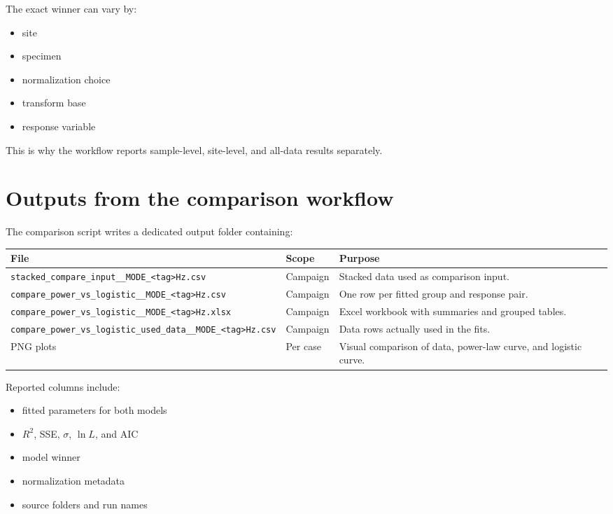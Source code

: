 \documentclass[11pt]{article}
\begin{document}
The exact winner can vary by:
\begin{itemize}[leftmargin=1.5em]
\item site
\item specimen
\item normalization choice
\item transform base
\item response variable
\end{itemize}

This is why the workflow reports sample-level, site-level, and all-data results separately.

\section{Outputs from the comparison workflow}

The comparison script writes a dedicated output folder containing:
\begin{longtable}{p{} p{} p{}}
\toprule
\textbf{File} & \textbf{Scope} & \textbf{Purpose}\\
\midrule
\endhead
\texttt{stacked\_compare\_input\_\_MODE\_<tag>Hz.csv} & Campaign & Stacked data used as comparison input.\\
\texttt{compare\_power\_vs\_logistic\_\_MODE\_<tag>Hz.csv} & Campaign & One row per fitted group and response pair.\\
\texttt{compare\_power\_vs\_logistic\_\_MODE\_<tag>Hz.xlsx} & Campaign & Excel workbook with summaries and grouped tables.\\
\texttt{compare\_power\_vs\_logistic\_used\_data\_\_MODE\_<tag>Hz.csv} & Campaign & Data rows actually used in the fits.\\
PNG plots & Per case & Visual comparison of data, power-law curve, and logistic curve.\\
\bottomrule
\end{longtable}

Reported columns include:
\begin{itemize}[leftmargin=1.5em]
\item fitted parameters for both models
\item $R^2$, SSE, $\sigma$, $\ln L$, and AIC
\item model winner
\item normalization metadata
\item source folders and run names
\end{itemize}
\end{document}
